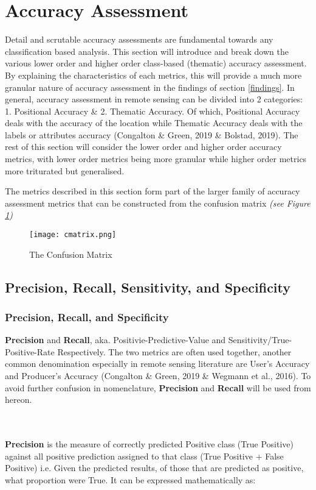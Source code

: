 \documentclass[11pt, a4paper, twoside]{report}
\begin{document}
\section{Accuracy Assessment}\label{AccAss}


Detail and scrutable accuracy assessments are fundamental towards any classification based analysis. This section will introduce and break down the various lower order and higher order class-based (thematic) accuracy assessment. By explaining the characteristics of each metrics, this will provide a much more granular nature of accuracy assessment in the findings of section \ref{findings}. In general, accuracy assessment in remote sensing can be divided into 2 categories: 1. Positional Accuracy \& 2. Thematic Accuracy. Of which, Positional Accuracy deals with the accuracy of the location while Thematic Accuracy deals with the labels or attributes accuracy (Congalton \& Green, 2019 \& Bolstad, 2019). The rest of this section will consider the lower order and higher order accuracy metrics, with lower order metrics being more granular while higher order metrics more triturated but generalised.\\\par

The metrics described in this section form part of the larger family of accuracy assessment metrics that can be constructed from the confusion matrix \textit{(see Figure \ref{fig:cmatrix})}

\begin{figure}[H]
  \centering
  \texttt{[image: cmatrix.png]}
  \caption{The Confusion Matrix}
  \label{fig:cmatrix}
\end{figure}

\subsection{Precision, Recall, Sensitivity, and Specificity}\label{1storder}
\subsubsection{Precision, Recall, and Specificity}\label{PR&S}

\textbf{Precision} and \textbf{Recall}, aka. Positivie-Predictive-Value and Sensitivity/True-Positive-Rate Respectively. The two metrics are often used together, another common denomination especially in remote sensing literature are User's Accuracy and Producer's Accuracy (Congalton \& Green, 2019 \& Wegmann et al., 2016). To avoid further confusion in nomenclature, \textbf{Precision} and \textbf{Recall} will be used from hereon.\\\par
\\
\\
\textbf{Precision} is the measure of correctly predicted Positive class (True Positive) against all positive prediction assigned to that class (True Positive + False Positive) i.e. Given the predicted results, of those that are predicted as positive, what proportion were True. It can be expressed mathematically as:
\end{document}
